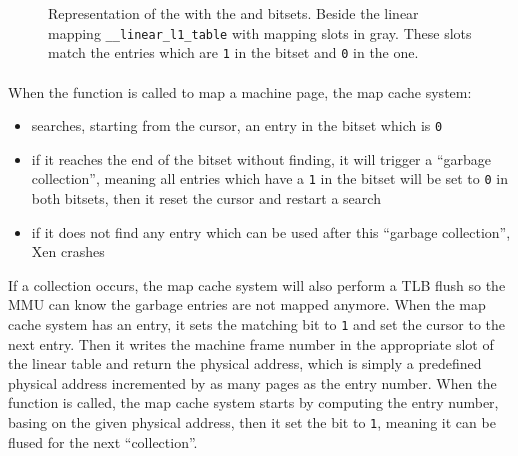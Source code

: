 \begin{figure}
  \caption{\label{figure dcache scheme}Representation of the \dcache with
    the \inuse and \garbage bitsets.
    Beside the linear mapping \texttt{\_\_linear\_l1\_table} with mapping slots
    in gray.
    These slots match the entries which are \texttt{1} in the \inuse bitset and
    \texttt{0} in the \garbage one.}
\end{figure}

\paragraph{}
When the \map function is called to map a machine page, the map cache system:
\begin{itemize}
\item searches, starting from the cursor, an entry in the \inuse bitset which
  is \texttt{0}
\item if it reaches the end of the bitset without finding, it will trigger a
  ``garbage collection'', meaning all entries which have a \texttt{1}
  in the \garbage bitset will be set to \texttt{0} in both bitsets, then
  it reset the cursor and restart a search
\item if it does not find any entry which can be used after this
  ``garbage collection'', Xen crashes
\end{itemize}
If a collection occurs, the map cache system will also perform a TLB flush so
the MMU can know the garbage entries are not mapped anymore.
When the map cache system has an entry, it sets the matching \inuse bit to
\texttt{1} and set the cursor to the next entry.
Then it writes the machine frame number in the appropriate slot of the linear
table and return the physical address, which is simply a predefined physical
address incremented by as many pages as the entry number.
When the \unmap function is called, the map cache system starts by computing
the entry number, basing on the given physical address, then it set the
\garbage bit to \texttt{1}, meaning it can be flused for the next
``collection''.

